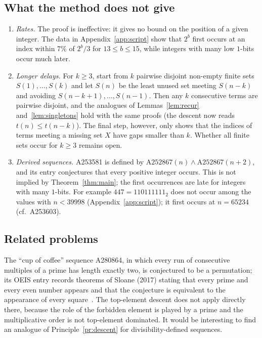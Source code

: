 \documentclass[11pt]{amsart}
\theoremstyle{definition}
\theoremstyle{remark}
\begin{document}
\subsection{What the method does not give}
\begin{enumerate}[leftmargin=2em]
\item \emph{Rates.} The proof is ineffective: it gives no bound on the position of a given
integer. The data in Appendix~\ref{app:script} show that $2^b$ first occurs at an index within $7\%$
of $2^b/3$ for $13\le b\le 15$, while integers with many low $1$-bits occur much later.
\item \emph{Longer delays.} For $k\ge3$, start from $k$ pairwise disjoint non-empty finite sets
$S(1),\dots,S(k)$ and let $S(n)$ be the least unused set meeting $S(n-k)$ and avoiding
$S(n-k+1),\dots,S(n-1)$. Then any $k$ consecutive terms are pairwise disjoint, and the
analogues of Lemmas~\ref{lem:recur} and~\ref{lem:singletons} hold with the same proofs (the
descent now reads $t(n)\le t(n-k)$). The final step, however, only shows that the indices of
terms meeting a missing set $X$ have gaps smaller than $k$. Whether all finite sets occur for
$k\ge3$ remains open.
\item \emph{Derived sequences.} A253581 is defined by $\mathrm{A252867}(n)\wedge
\mathrm{A252867}(n+2)$, and its entry conjectures that every positive integer occurs. This is
not implied by Theorem~\ref{thm:main}; the first occurrences are late for integers with many
$1$-bits. For example $447=110111111_2$ does not occur among the values with $n<39998$
(Appendix~\ref{app:script}); it first occurs at $n=65234$ (cf.\ A253603).
\end{enumerate}

\subsection{Related problems}
The ``cup of coffee'' sequence A280864, in which every run of consecutive multiples of a prime
has length exactly two, is conjectured to be a permutation; its OEIS entry records theorems of
Sloane (2017) stating that every prime and every even number appears and that the conjecture is
equivalent to the appearance of every square~\cite{A280864}. The top-element descent does not
apply directly there, because the role of the
forbidden element is played by a prime and the multiplicative order is not top-element
dominated. It would be interesting to find an analogue of Principle~\ref{pr:descent} for
divisibility-defined sequences.
\end{document}
